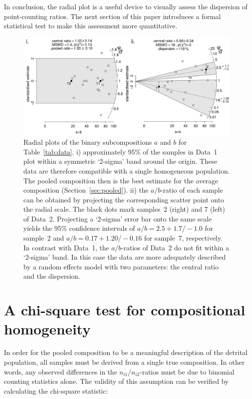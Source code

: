 \documentclass{article}
\begin{document}
In conclusion, the radial plot is a useful device to visually assess
the dispersion of point-counting ratios. The next section of this
paper introduces a formal statistical test to make this assessment
more quantitative.

\begin{figure}[!ht]
  \includegraphics[width=\textwidth]{radialplots.png}
  \caption{Radial plots of the binary subcompositions $a$ and $b$ for
    Table~\ref{tab:data}.  i) approximately 95\% of the samples in
    Data~1 plot within a symmetric `2-sigma' band around the
    origin. These data are therefore compatible with a single
    homogeneous population. The pooled composition then is the best
    estimate for the average composition (Section~\ref{sec:pooled}).
    ii) the $a/b$-ratio of each sample can be obtained by projecting
    the corresponding scatter point onto the radial scale.  The black
    dots mark samples~2 (right) and 7 (left) of Data~2. Projecting a
    `2-sigma' error bar onto the same scale yields the 95\% confidence
    intervals of $a/b = 2.5 +1.7/-1.0$ for sample~2 and $a/b = 0.17
    +1.20/-0.16$ for sample~7, respectively. In contrast with Data~1,
    the $a/b$-ratios of Data~2 do not fit within a `2-sigma' band.  In
    this case the data are more adequately described by a random
    effects model with two parameters: the central ratio and the
    dispersion.}
  \label{fig:radial}
\end{figure}

\section{A chi-square test for compositional homogeneity}
\label{sec:X2}

In order for the pooled composition to be a meaningful description of
the detrital population, all samples must be derived from a single
true composition. In other words, any observed differences in the
$n_{i1}/n_{i2}$-ratios must be due to binomial counting statistics
alone. The validity of this assumption can be verified by calculating
the chi-square statistic:
\end{document}

